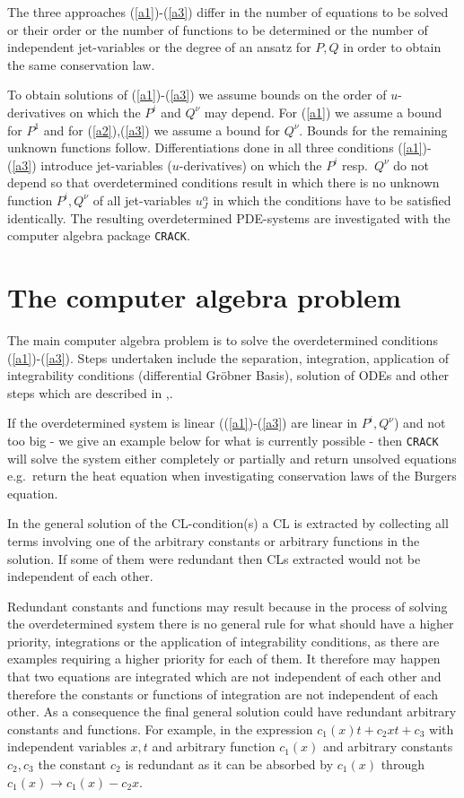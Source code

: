 The three approaches (\ref{a1})-(\ref{a3})
differ in the number of equations to be solved or their order or the
number of functions to be determined or the number of independent
jet-variables or the degree of an ansatz for $P,Q$ in order to
obtain the same conservation law. 

To obtain solutions of (\ref{a1})-(\ref{a3}) we assume
bounds on the order of $u$-derivatives on which the $P^i$ and $Q^{\nu}$
may depend. For (\ref{a1}) we assume a bound for $P^1$ and for
(\ref{a2}),(\ref{a3}) we assume a bound for $Q^{\nu}$.
Bounds for the remaining unknown functions follow.
Differentiations done in all three conditions
(\ref{a1})-(\ref{a3}) introduce jet-variables ($u$-derivatives)
on which the $P^i$ resp.\ $Q^{\nu}$ do not depend so that overdetermined
conditions result in which there is no unknown function $P^i,Q^{\nu}$
of all jet-variables $u^{\alpha}_{J}$
in which the conditions have to be satisfied identically. 
The resulting overdetermined
PDE-systems are investigated with the computer algebra
package {\tt CRACK}.

\section{The computer algebra problem}
The main computer algebra problem is to solve the overdetermined
conditions (\ref{a1})-(\ref{a3}). Steps undertaken  
include the separation, integration, application of integrability
conditions (differential Gr\"{o}bner Basis), solution of ODEs and other steps
which are described in \cite{CRACK1},\cite{CRACK2}.

If the overdetermined system is linear ((\ref{a1})-(\ref{a3}) are
linear in $P^i,Q^{\nu}$)  and not too big - we give an example below
for what is currently possible - then {\tt CRACK} will solve the
system either completely or partially and return unsolved equations 
e.g.\ return the heat equation when investigating conservation laws of the
Burgers equation.

In the general solution of the CL-condition(s) a CL is extracted by
collecting all terms involving one of the arbitrary constants or
arbitrary functions in the solution. If some of them were redundant
then CLs extracted would not be independent of each other.

Redundant constants and functions may result because
in the process of solving the overdetermined system there is no general
rule for what should have a higher priority, integrations or 
the application of integrability conditions,
as there are examples requiring a higher priority for each of them.
It therefore may happen that
two equations are integrated which are not independent of each
other and therefore the constants or functions of integration are
not independent of each other. As a consequence the final general 
solution could have redundant arbitrary constants and functions.
For example, in the expression $c_1(x) t + c_2 x t + c_3$ with
independent variables $x,t$ and arbitrary function $c_1(x)$ and
arbitrary constants $c_2,c_3$ the constant $c_2$ is redundant
as it can be absorbed by $c_1(x)$ through $c_1(x) \rightarrow 
c_1(x) - c_2 x$.

